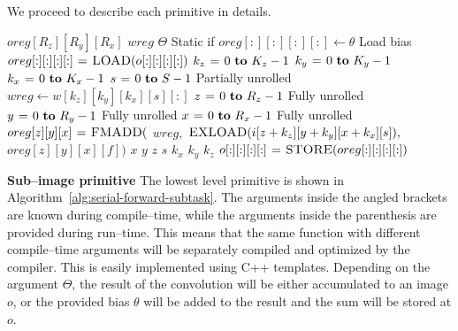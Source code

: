   We proceed to describe each primitive in details.

  \begin{algorithm}
    {\footnotesize
      \begin{codebox}
        \li {} $oreg[R_z][R_y][R_x]$
        \li {} $wreg$
        \li \If $\Theta$ \Comment Static if
        \li \Then $oreg[:][:][:][:] \gets \theta$ \Comment Load bias
        \li \Else
        \li       $oreg[:][:][:][:] \mathrel{\hspace{1pt}=\hspace{1pt}} \textnormal{\scshape LOAD}(o[:][:][:][:])$
        \End \li {}
        \li {} $k_z \gets 0 \To K_z-1$
        \li   \Do {} $k_y \gets 0 \To K_y-1$
        \li      \Do {} $k_x \gets 0 \To K_x-1$
        \li         \Do {} $s \gets 0 \To S - 1$ \Comment Partially unrolled
        \li         \Do $wreg \gets w[k_z][k_y][k_x][s][:]$
        \li {} $z \gets 0 \To R_z-1$ \Comment Fully unrolled
        \li   \Do {} $y \gets 0 \To R_y-1$ \Comment Fully unrolled
        \li      \Do {} $x \gets 0 \To R_x-1$ \Comment Fully unrolled
        \li         \Do $oreg[z][y][x] \mathrel{\hspace{1pt}=\hspace{1pt}} \textnormal{\scshape FMADD}($
        \li       $wreg,$
        \li       $\textnormal{\scshape EXLOAD}(i[z+k_z][y+k_y][x+k_x][s]),$
        \li       $oreg[z][y][x][f])$
        \End \li {} $x$
        \End \li {} $y$
        \End \li {} $z$
        \End \li {} $s$
        \End \li {} $k_x$
        \End \li {} $k_y$
        \End \li {} $k_z$
        \li $o[:][:][:][:] \mathrel{\hspace{1pt}=\hspace{1pt}} \textnormal{\scshape STORE}(oreg[:][:][:][:])$
      \end{codebox}
    \caption{The finest granularity primitive that computes a
      sub--image of size $R_z \times R_y \times R_x$ of $S$ images by
      performing $S^2$ convolutions on $S$ input images with a kernel
      of size $K_z \times K_y \times K_x$.}
    \label{alg:serial-forward-subtask}
    }
  \end{algorithm}

  {\bf Sub--image primitive} \quad The lowest level primitive is shown
  in Algorithm~\ref{alg:serial-forward-subtask}.  The arguments inside
  the angled brackets are known during compile--time, while the
  arguments inside the parenthesis are provided during run--time.
  This means that the same function with different compile--time
  arguments will be separately compiled and optimized by the compiler.
  This is easily implemented using C++ templates.  Depending on the
  argument $\Theta$, the result of the convolution will be either
  accumulated to an image $o$, or the provided bias $\theta$ will be
  added to the result and the sum will be stored at $o$.

